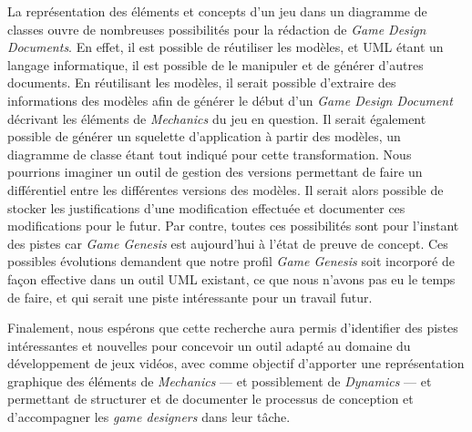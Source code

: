\begin{conclusion}
La représentation des éléments et concepts d'un jeu dans un diagramme de classes ouvre de nombreuses possibilités pour la rédaction de \emph{Game Design Documents}.
En effet, il est possible de réutiliser les modèles, et UML étant un langage informatique, il est possible de le manipuler et de générer d'autres documents.
En réutilisant les modèles, il serait possible d'extraire des informations des modèles afin de générer le début d'un \emph{Game Design Document} décrivant les éléments de \emph{Mechanics} du jeu en question.
Il serait également possible de générer un squelette d'application à partir des modèles, un diagramme de classe étant tout indiqué pour cette transformation.
Nous pourrions imaginer un outil de gestion des versions permettant de faire un différentiel entre les différentes versions des modèles.
Il serait alors possible de stocker les justifications d'une modification effectuée et documenter ces modifications pour le futur.
%
Par contre, toutes ces possibilités sont pour l'instant des pistes car \emph{Game Genesis} est aujourd'hui à l'état de preuve de concept.
Ces possibles évolutions demandent que notre profil
\emph{Game Genesis} soit incorporé de façon effective dans un outil
UML existant, ce que nous n'avons pas eu le temps de faire, et qui
serait une piste intéressante pour un travail futur.





Finalement, nous espérons que cette recherche aura permis d'identifier des pistes intéressantes et nouvelles pour concevoir un outil adapté au domaine du développement de jeux vidéos, avec comme objectif d'apporter une représentation graphique des éléments de \emph{Mechanics} --- et possiblement de \emph{Dynamics} --- et  permettant de structurer et de documenter le processus de conception et d'accompagner les \emph{game designers} dans leur tâche.



\end{conclusion}
